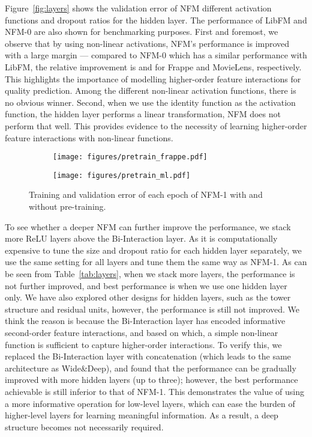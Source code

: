 Figure~\ref{fig:layers} shows the validation error of NFM \wrt different activation functions and dropout ratios for the hidden layer. The performance of LibFM and NFM-0 are also shown for benchmarking purposes. 
First and foremost, we observe that by using non-linear activations, NFM's performance is improved with a large margin --- compared to NFM-0 which has a similar performance with LibFM, the relative improvement is  and  for Frappe and MovieLens, respectively. 
This highlights the importance of modelling higher-order feature interactions for quality prediction. 
Among the different non-linear activation functions, there is no obvious winner. 
Second, when we use the identity function as the activation function, \ie the hidden layer performs a linear transformation, NFM does not perform that well. 
This provides evidence to the necessity of learning higher-order feature interactions with non-linear functions. 

\begin{figure}[t]
	\centering
	\begin{subfigure}[b]{0.22\textwidth}
		\centering
		\texttt{[image: figures/pretrain\_frappe.pdf]}
		\vspace{-22pt}
\label{fig:pretrain_frappe}
	\end{subfigure} 
	\begin{subfigure}[b]{0.22\textwidth}
		\centering
		\texttt{[image: figures/pretrain\_ml.pdf]}
		\vspace{-22pt}
\label{fig:pretrain_ml}
	\end{subfigure} 
	\caption{Training and validation error of each epoch of NFM-1 with and without pre-training.}
	\vspace{-12pt}
	\label{fig:pretrain}
\end{figure}

To see whether a deeper NFM can further improve the performance, we stack more ReLU layers above the Bi-Interaction layer. 
As it is computationally expensive to tune the size and dropout ratio for each hidden layer separately, we use the same setting for all layers and tune them the same way as NFM-1. 
As can be seen from Table~\ref{tab:layers}, when we stack more layers, the performance is not further improved, and best performance is when we use one hidden layer only. 
We have also explored other designs for hidden layers,
such as the tower structure and residual units, however, the performance is still not improved. 
We think the reason is because the Bi-Interaction layer has encoded informative second-order feature interactions, and based on which, a simple non-linear function is sufficient to capture higher-order interactions. 
To verify this, we replaced the Bi-Interaction layer with concatenation (which leads to the same architecture as Wide\&Deep), and found that the performance can be gradually improved with more hidden layers (up to three); however, the best performance achievable is still inferior to that of NFM-1.
This demonstrates the value of using a more informative operation for low-level layers, which can ease the burden of higher-level layers for learning meaningful information. As a result, a deep structure becomes not necessarily required.

